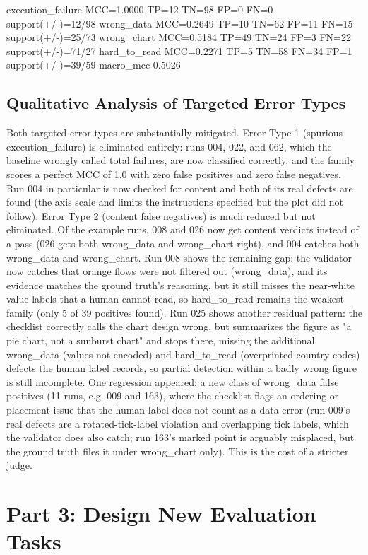 \documentclass[11pt]{article}
\begin{document}
    execution_failure    MCC=1.0000  TP=12 TN=98 FP=0 FN=0  support(+/-)=12/98
    wrong_data           MCC=0.2649  TP=10 TN=62 FP=11 FN=15  support(+/-)=25/73
    wrong_chart          MCC=0.5184  TP=49 TN=24 FP=3 FN=22  support(+/-)=71/27
    hard_to_read         MCC=0.2271  TP=5 TN=58 FN=34 FP=1  support(+/-)=39/59
    macro_mcc            0.5026

\subsection{Qualitative Analysis of Targeted Error Types}
Both targeted error types are substantially mitigated. Error Type 1 (spurious execution_failure) is eliminated entirely: runs 004, 022, and 062, which the baseline wrongly called total failures, are now classified correctly, and the family scores a perfect MCC of 1.0 with zero false positives and zero false negatives. Run 004 in particular is now checked for content and both of its real defects are found (the axis scale and limits the instructions specified but the plot did not follow). Error Type 2 (content false negatives) is much reduced but not eliminated. Of the example runs, 008 and 026 now get content verdicts instead of a pass (026 gets both wrong_data and wrong_chart right), and 004 catches both wrong_data and wrong_chart. Run 008 shows the remaining gap: the validator now catches that orange flows were not filtered out (wrong_data), and its evidence matches the ground truth's reasoning, but it still misses the near-white value labels that a human cannot read, so hard_to_read remains the weakest family (only 5 of 39 positives found). Run 025 shows another residual pattern: the checklist correctly calls the chart design wrong, but summarizes the figure as "a pie chart, not a sunburst chart" and stops there, missing the additional wrong_data (values not encoded) and hard_to_read (overprinted country codes) defects the human label records, so partial detection within a badly wrong figure is still incomplete. One regression appeared: a new class of wrong_data false positives (11 runs, e.g. 009 and 163), where the checklist flags an ordering or placement issue that the human label does not count as a data error (run 009's real defects are a rotated-tick-label violation and overlapping tick labels, which the validator does also catch; run 163's marked point is arguably misplaced, but the ground truth files it under wrong_chart only). This is the cost of a stricter judge.

\section{Part 3: Design New Evaluation Tasks}
\end{document}
